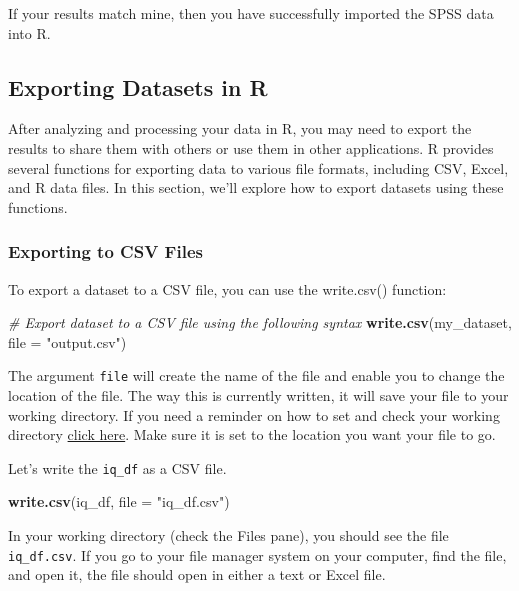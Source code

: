 \documentclass[
]{book}
\newenvironment{Shaded}{\begin{snugshade}}{\end{snugshade}}
\newcommand{\AttributeTok}[1]{\textcolor[rgb]{0.13,0.29,0.53}{#1}}
\newcommand{\CommentTok}[1]{\textcolor[rgb]{0.56,0.35,0.01}{\textit{#1}}}
\newcommand{\FunctionTok}[1]{\textcolor[rgb]{0.13,0.29,0.53}{\textbf{#1}}}
\newcommand{\NormalTok}[1]{#1}
\newcommand{\StringTok}[1]{\textcolor[rgb]{0.31,0.60,0.02}{#1}}
\begin{document}
If your results match mine, then you have successfully imported the SPSS data into R.

\hypertarget{exporting-datasets-in-r}{%
\subsection{Exporting Datasets in R}\label{exporting-datasets-in-r}}

After analyzing and processing your data in R, you may need to export the results to share them with others or use them in other applications. R provides several functions for exporting data to various file formats, including CSV, Excel, and R data files. In this section, we'll explore how to export datasets using these functions.

\hypertarget{exporting-to-csv-files}{%
\subsubsection{Exporting to CSV Files}\label{exporting-to-csv-files}}

To export a dataset to a CSV file, you can use the write.csv() function:

\begin{Shaded}
\begin{Highlighting}[]
\CommentTok{\# Export dataset to a CSV file using the following syntax}
\FunctionTok{write.csv}\NormalTok{(my\_dataset, }\AttributeTok{file =} \StringTok{"output.csv"}\NormalTok{)}
\end{Highlighting}
\end{Shaded}

The argument \texttt{file} will create the name of the file and enable you to change the location of the file. The way this is currently written, it will save your file to your working directory. If you need a reminder on how to set and check your working directory \protect\hyperlink{set_wd}{click here}. Make sure it is set to the location you want your file to go.

Let's write the \texttt{iq\_df} as a CSV file.

\begin{Shaded}
\begin{Highlighting}[]
\FunctionTok{write.csv}\NormalTok{(iq\_df, }\AttributeTok{file =} \StringTok{"iq\_df.csv"}\NormalTok{)}
\end{Highlighting}
\end{Shaded}

In your working directory (check the Files pane), you should see the file \texttt{iq\_df.csv}. If you go to your file manager system on your computer, find the file, and open it, the file should open in either a text or Excel file.
\end{document}
